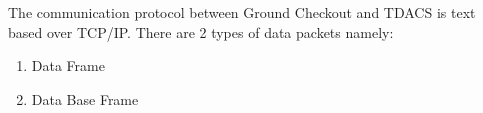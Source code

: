 \par The communication protocol between Ground Checkout and TDACS is text based
over TCP/IP. There are 2 types of data packets namely:
\begin{enumerate}
	\item Data Frame
	\item Data Base Frame
\end{enumerate}

